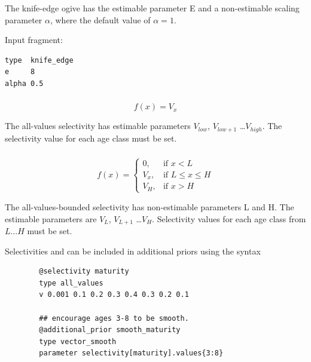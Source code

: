 The knife-edge ogive has the estimable parameter E and a non-estimable scaling parameter $\alpha$, where the default value of $\alpha = 1$.

Input fragment: {\small{\begin{verbatim}
type  knife_edge
e     8
alpha 0.5
\end{verbatim}}}

\subsubsection[All-values]{}

\begin{equation}
f(x)=V_x
\end{equation}

The all-values selectivity has estimable parameters $V_{low}$, $V_{low+1}$ \ldots $V_{high}$. The selectivity value for each age class must be set.

\subsubsection[All-values-bounded]{}

\begin{equation}
f(x)=\begin{cases}
		 0, & \text{if $x < L$} \\
		 V_x, & \text{if $L \le x \le H$} \\
		 V_H, & \text{if $x > H$}
  \end{cases}
\end{equation}

The all-values-bounded selectivity has non-estimable parameters L and H. The estimable parameters are $V_L$, $V_{L+1}$ \ldots $V_H$. Selectivity values for each age class from $L \ldots H$ must be set.


Selectivities  and  can be included in additional priors using the syntax

{\small{\begin{verbatim}
		@selectivity maturity
		type all_values
		v 0.001 0.1 0.2 0.3 0.4 0.3 0.2 0.1

		## encourage ages 3-8 to be smooth.
		@additional_prior smooth_maturity
		type vector_smooth
		parameter selectivity[maturity].values{3:8}

		\end{verbatim}}}

